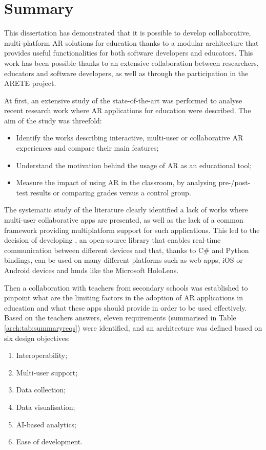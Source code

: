 \section{Summary}
This dissertation has demonstrated that it is possible to develop collaborative, multi-platform AR solutions for education thanks to a modular architecture that provides useful functionalities for both software developers and educators. This work has been possible thanks to an extensive collaboration between researchers, educators and software developers, as well as through the participation in the ARETE project. 

At first, an extensive study of the state-of-the-art was performed to analyse recent research work where AR applications for education were described. The aim of the study was threefold:
\begin{itemize}
    \item Identify the works describing interactive, multi-user or collaborative AR experiences and compare their main features;
    \item Understand the motivation behind the usage of AR as an educational tool;
    \item Measure the impact of using AR in the classroom, by analysing pre-/post- test results or comparing grades versus a control group.
\end{itemize}

The systematic study of the literature clearly identified a lack of works where multi-user collaborative apps are presented, as well as the lack of a common framework providing multiplatform support for such applications. This led to the decision of developing \ork{}, an open-source library that enables real-time communication between different devices and that, thanks to C\# and Python bindings, can be used on many different platforms such as web apps, iOS or Android devices and \glspl{hmd} like the Microsoft HoloLens.

Then a collaboration with teachers from secondary schools was established to pinpoint what are the limiting factors in the adoption of AR applications in education and what these apps should provide in order to be used effectively. Based on the teachers answers, eleven requirements (summarised in Table \ref{arch:tab:summaryreqs}) were identified, and an architecture was defined based on six design objectives:
\begin{enumerate}[start=1,label={\bfseries DO\arabic*:}]
    \item Interoperability;
    \item Multi-user support;
    \item Data collection;
    \item Data visualisation;
    \item AI-based analytics;
    \item Ease of development.
\end{enumerate}

